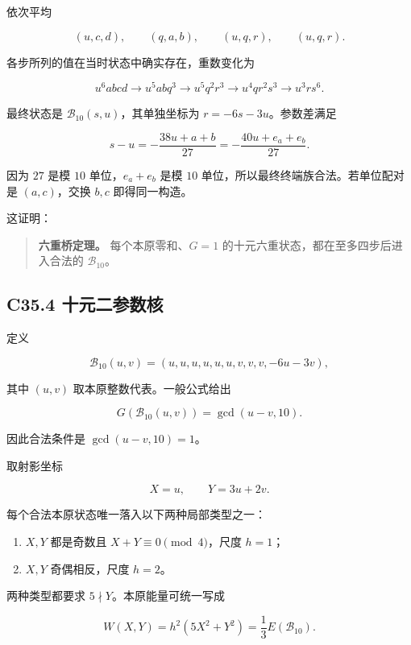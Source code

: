 \documentclass[11pt,a4paper]{article}
\newcommand{\tightlist}{\setlength{\itemsep}{0pt}\setlength{\parskip}{0pt}}
\theoremstyle{definition}
\numberwithin{equation}{section}
\begin{document}
{依次平均}

\[
(u,c,d),\qquad(q,a,b),\qquad(u,q,r),\qquad(u,q,r).
\]

{各步所列的值在当时状态中确实存在，重数变化为}

\[
u^6abcd
\longrightarrow u^5abq^3
\longrightarrow u^5q^2r^3
\longrightarrow u^4qr^2s^3
\longrightarrow u^3rs^6.
\]

{最终状态是} \(\mathcal B_{10}(s,u)\){，其单独坐标为} \(r=-6s-3u\){。参数差满足}

\[
s-u=-\frac{38u+a+b}{27}
=-\frac{40u+e_a+e_b}{27}.
\]

{因为} \(27\) {是模} \(10\) {单位，}\(e_a+e_b\) {是模} \(10\) {单位，所以最终终端族合法。若单位配对是} \((a,c)\){，交换} \(b,c\) {即得同一构造。}

{这证明：}

\begin{quote}
\textbf{{六重桥定理。}} {每个本原零和、}\(G=1\) {的十元六重状态，都在至多四步后进入合法的} \(\mathcal B_{10}\){。}
\end{quote}

\subsection*{\texorpdfstring{{C35.4} {十元二参数核}}{C35.4 十元二参数核}}\label{C35-h236}

{定义}

\[
\mathcal B_{10}(u,v)
=(u,u,u,u,u,u,v,v,v,-6u-3v),
\]

{其中} \((u,v)\) {取本原整数代表。一般公式给出}

\[
G(\mathcal B_{10}(u,v))=\gcd(u-v,10).
\]

{因此合法条件是} \(\gcd(u-v,10)=1\){。}

{取射影坐标}

\[
X=u,\qquad Y=3u+2v.
\]

{每个合法本原状态唯一落入以下两种局部类型之一：}

\begin{enumerate}
\def\labelenumi{\arabic{enumi}.}
\tightlist
\item
  \(X,Y\) {都是奇数且} \(X+Y\equiv0\pmod4\){，尺度} \(h=1\){；}
\item
  \(X,Y\) {奇偶相反，尺度} \(h=2\){。}
\end{enumerate}

{两种类型都要求} \(5\nmid Y\){。本原能量可统一写成}

\[
W(X,Y)=h^2(5X^2+Y^2)=\frac13E(\mathcal B_{10}).
\tag{C35.4.1}
\]
\end{document}
